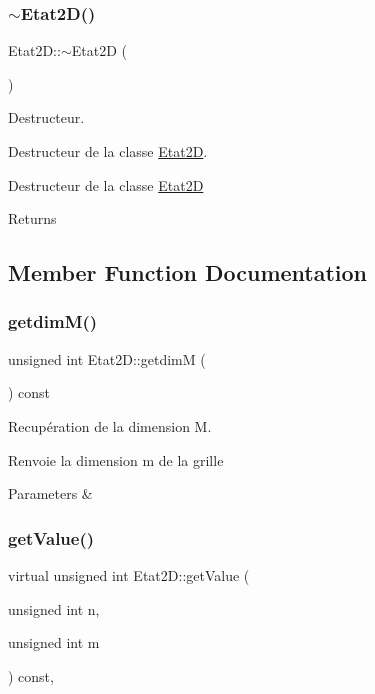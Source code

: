 \subsubsection{\texorpdfstring{$\sim$\+Etat2\+D()}{~Etat2D()}}
{\footnotesize\ttfamily Etat2\+D\+::$\sim$\+Etat2D (\begin{DoxyParamCaption}{ }\end{DoxyParamCaption})}



Destructeur. 

Destructeur de la classe \mbox{\hyperlink{class_etat2_d}{Etat2D}}.

Destructeur de la classe \mbox{\hyperlink{class_etat2_d}{Etat2D}}

\begin{DoxyReturn}{Returns}

\end{DoxyReturn}


\subsection{Member Function Documentation}
\mbox{\label{class_etat2_d_abcef6210d2c55b8fe4e33c9d29a1ac90}} 
\subsubsection{\texorpdfstring{getdim\+M()}{getdimM()}}
{\footnotesize\ttfamily unsigned int Etat2\+D\+::getdimM (\begin{DoxyParamCaption}{ }\end{DoxyParamCaption}) const\hspace{0.3cm}{\ttfamily [inline]}}



Recupération de la dimension M. 

Renvoie la dimension m de la grille


\begin{DoxyParams}{Parameters}
{\em } & \\
\hline
\end{DoxyParams}
\mbox{\label{class_etat2_d_a6efc3996c7578b7fb1de71402021c389}} 
\subsubsection{\texorpdfstring{get\+Value()}{getValue()}}
{\footnotesize\ttfamily virtual unsigned int Etat2\+D\+::get\+Value (\begin{DoxyParamCaption}\item[{unsigned int}]{n,  }\item[{unsigned int}]{m }\end{DoxyParamCaption}) const\hspace{0.3cm}{\ttfamily [inline]}, {\ttfamily [virtual]}}



